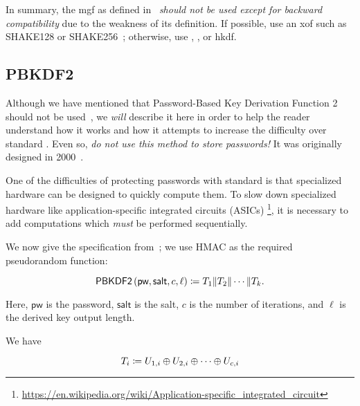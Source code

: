 


In summary, the \gls{mgf} as defined in~\cite{rfc8017}
\emph{should not be used except for backward compatibility}
due to the weakness of its definition.
If possible, use an \gls{xof} such as
SHAKE128 or SHAKE256~\cite{FIPS-202,NIST-SP-800-185};
otherwise, use \ExpandMsgXmd{}, \ExpandMsgXof{}, or
\gls{hkdf}.


\subsection{PBKDF2}
\label{app:crypto_pbkdf2}

Although we have mentioned that
Password-Based Key Derivation Function 2~\cite{rfc8018}
should not be used~\cite{blocki2018economics},
we \emph{will} describe it here in order to help the reader understand
how it works and how it attempts to increase the difficulty
over standard .
Even so, \emph{do not use this method to store passwords!}
It was originally designed in 2000~\cite{rfc2898}.

One of the difficulties of protecting passwords with standard
 is that specialized hardware
can be designed to quickly compute them.
To slow down specialized hardware like
application-specific integrated circuits (ASICs)%
\footnote{\url{https://en.wikipedia.org/wiki/Application-specific_integrated_circuit}},
it is necessary to add computations
which \emph{must} be performed sequentially.



We now give the specification from~\cite{rfc8018};
we use \textsf{HMAC} as the required pseudorandom function:

\begin{equation}
    \textsf{PBKDF2}\left( \textsf{pw}, \textsf{salt}, c, \ell \right)
        \coloneqq{} T_{1} \| T_{2} \| \cdots \| T_{k}.
\end{equation}

\noindent
Here, $\textsf{pw}$ is the password,
$\textsf{salt}$ is the \gls{salt},
$c$ is the number of iterations,
and $\ell$ is the derived key output length.

We have

\begin{equation}
    T_{i} \coloneqq{} U_{1,i} \oplus U_{2,i} \oplus \cdots \oplus U_{c,i}
\end{equation}

